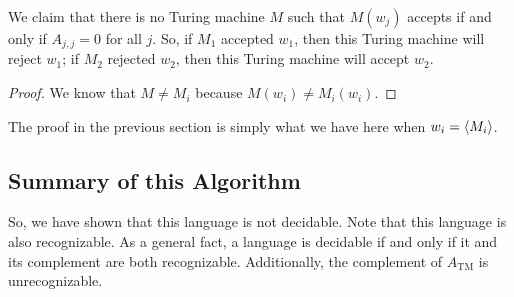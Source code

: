 \documentclass[letterpaper]{article}
\begin{document}
We claim that there is no Turing machine $M$ such that $M(w_j)$ accepts if and only if $A_{j, j} = 0$ for all $j$. So, if $M_1$ accepted $w_1$, then this Turing machine will reject $w_1$; if $M_2$ rejected $w_2$, then this Turing machine will accept $w_2$. 

\begin{mdframed}[]
    \begin{proof}
        We know that $M \neq M_i$ because $M(w_i) \neq M_{i}(w_i)$.
    \end{proof}
\end{mdframed}
The proof in the previous section is simply what we have here when $w_i = \langle M_i \rangle$. 

\subsection{Summary of this Algorithm}
So, we have shown that this language is not decidable. Note that this language is also recognizable. As a general fact, a language is decidable if and only if it and its complement are both recognizable. Additionally, the complement of $A_{\text{TM}}$ is unrecognizable. 











\newpage 
\end{document}
